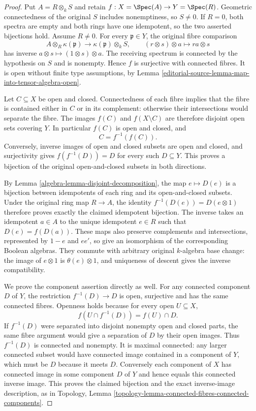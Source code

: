 \begin{proof}
Put $A=R\otimes_k S$ and retain
$f:X=\Spec(A)\to Y=\Spec(R)$.
Geometric connectedness of the
original $S$ includes nonemptiness,
so $S\neq0$. If $R=0$, both
spectra are empty and both
rings have one idempotent,
so the two asserted bijections
hold. Assume $R\neq0$.
For every $\mathfrak p\in Y$,
the original fibre comparison
$$
A\otimes_R\kappa(\mathfrak p)\longrightarrow
\kappa(\mathfrak p)\otimes_k S,
\qquad(r\otimes s)\otimes a\longmapsto ra\otimes s
$$
has inverse $a\otimes s\mapsto(1\otimes s)\otimes a$.
The receiving spectrum is
connected by the hypothesis
on $S$ and is nonempty.
Hence $f$ is surjective with
connected fibres. It is open
without finite type assumptions,
by Lemma
\ref{editorial-source-lemma-map-into-tensor-algebra-open}.

Let $C\subseteq X$ be open
and closed. Connectedness
of each fibre implies that
the fibre is contained either
in $C$ or in its complement:
otherwise their intersections
would separate the fibre.
The images $f(C)$ and $f(X\setminus C)$
are therefore disjoint open
sets covering $Y$. In
particular $f(C)$ is open
and closed, and
$$
C=f^{-1}(f(C)).
$$
Conversely, inverse images of
open and closed subsets are
open and closed, and surjectivity
gives $f(f^{-1}(D))=D$ for
every such $D\subseteq Y$.
This proves a bijection of
the original open-and-closed
subsets in both directions.

By Lemma \ref{algebra-lemma-disjoint-decomposition},
the map $e\mapsto D(e)$ is
a bijection between idempotents
of each ring and its open-and-closed
subsets. Under the original
ring map $R\to A$, the
identity $f^{-1}(D(e))=D(e\otimes1)$
therefore proves exactly the
claimed idempotent bijection.
The inverse takes an idempotent
$a\in A$ to the unique
idempotent $e\in R$ such
that $D(e)=f(D(a))$.
These maps also preserve
complements and intersections,
represented by $1-e$ and
$ee'$, so give an isomorphism
of the corresponding Boolean
algebras. They commute with
arbitrary original $k$-algebra
base change: the image of
$e\otimes1$ is $\theta(e)\otimes1$,
and uniqueness of descent
gives the inverse compatibility.

We prove the component assertion
directly as well. For any
connected component $D$ of
$Y$, the restriction
$f^{-1}(D)\to D$ is open,
surjective and has the same
connected fibres. Openness
holds because for every open
$U\subseteq X$,
$$
f(U\cap f^{-1}(D))=f(U)\cap D.
$$
If $f^{-1}(D)$ were separated
into disjoint nonempty open
and closed parts, the same
fibre argument would give
a separation of $D$ by
their open images. Thus
$f^{-1}(D)$ is connected
and nonempty. It is maximal
connected: any larger connected
subset would have connected
image contained in a component
of $Y$, which must be $D$
because it meets $D$.
Conversely each component
of $X$ has connected image
in some component $D$ of
$Y$ and hence equals this
connected inverse image.
This proves the claimed
bijection and the exact
inverse-image description,
as in Topology, Lemma
\ref{topology-lemma-connected-fibres-connected-components}.


\end{proof}
